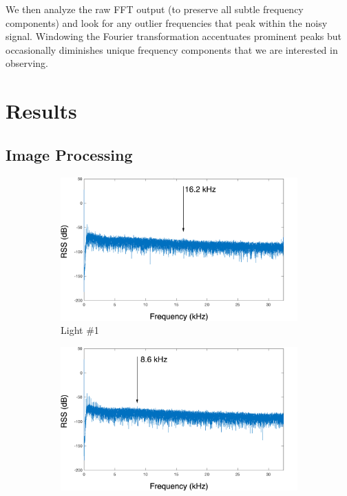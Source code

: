 \documentclass[conference]{IEEEtran}
\begin{document}
We then analyze the raw FFT output (to preserve all subtle frequency components) and look for any outlier frequencies that peak within the noisy signal. Windowing the Fourier transformation accentuates prominent peaks but occasionally diminishes unique frequency components that we are interested in observing.

\section{Results}\label{section:results}

\subsection{Image Processing}

\begin{figure}[!h]
	\begin{subfigure}{.245\textwidth}
		\centering
		\includegraphics[width=1\linewidth]{figures/A/light_1_16_2.png}
		\caption{Light \#1}
	\end{subfigure}
	\begin{subfigure}{.245\textwidth}
		\centering
		\includegraphics[width=1\linewidth]{figures/A/light_2_8_6_video.png}

\end{subfigure}
\end{figure}
\end{document}
